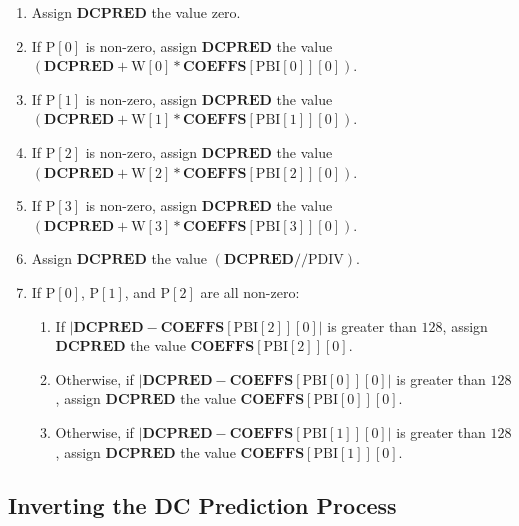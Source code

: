 \documentclass[9pt,letterpaper]{book}
\newcommand{\bitvar}[1]{\ensuremath{\mathbf{\bm{#1}}}}
\newcommand{\locvar}[1]{\ensuremath{\mathrm{#1}}}
\numberwithin{equation}{chapter}
\numberwithin{figure}{chapter}
\numberwithin{table}{chapter}
\begin{document}
\begin{enumerate}
\begin{enumerate}
\item
Assign \bitvar{DCPRED} the value zero.
\item
If $\locvar{P}[0]$ is non-zero, assign \bitvar{DCPRED} the value
 $(\bitvar{DCPRED}+\locvar{W}[0]*\bitvar{COEFFS}[\locvar{PBI}[0]][0])$.
\item
If $\locvar{P}[1]$ is non-zero, assign \bitvar{DCPRED} the value
 $(\bitvar{DCPRED}+\locvar{W}[1]*\bitvar{COEFFS}[\locvar{PBI}[1]][0])$.
\item
If $\locvar{P}[2]$ is non-zero, assign \bitvar{DCPRED} the value
 $(\bitvar{DCPRED}+\locvar{W}[2]*\bitvar{COEFFS}[\locvar{PBI}[2]][0])$.
\item
If $\locvar{P}[3]$ is non-zero, assign \bitvar{DCPRED} the value
 $(\bitvar{DCPRED}+\locvar{W}[3]*\bitvar{COEFFS}[\locvar{PBI}[3]][0])$.
\item
Assign \bitvar{DCPRED} the value $(\bitvar{DCPRED}//\locvar{PDIV})$.
\item
If $\locvar{P}[0]$, $\locvar{P}[1]$, and $\locvar{P}[2]$ are all non-zero:
\begin{enumerate}
\item
If $|\bitvar{DCPRED}-\bitvar{COEFFS}[\locvar{PBI}[2]][0]|$ is greater than
 $128$, assign \bitvar{DCPRED} the value $\bitvar{COEFFS}[\locvar{PBI}[2]][0]$.
\item
Otherwise, if $|\bitvar{DCPRED}-\bitvar{COEFFS}[\locvar{PBI}[0]][0]|$ is
 greater than $128$, assign \bitvar{DCPRED} the value
 $\bitvar{COEFFS}[\locvar{PBI}[0]][0]$.
\item
Otherwise, if $|\bitvar{DCPRED}-\bitvar{COEFFS}[\locvar{PBI}[1]][0]|$ is
 greater than $128$, assign \bitvar{DCPRED} the value
 $\bitvar{COEFFS}[\locvar{PBI}[1]][0]$.
\end{enumerate}
\end{enumerate}
\end{enumerate}

\subsection{Inverting the DC Prediction Process}
\label{sub:dc-pred-undo}
\end{document}

